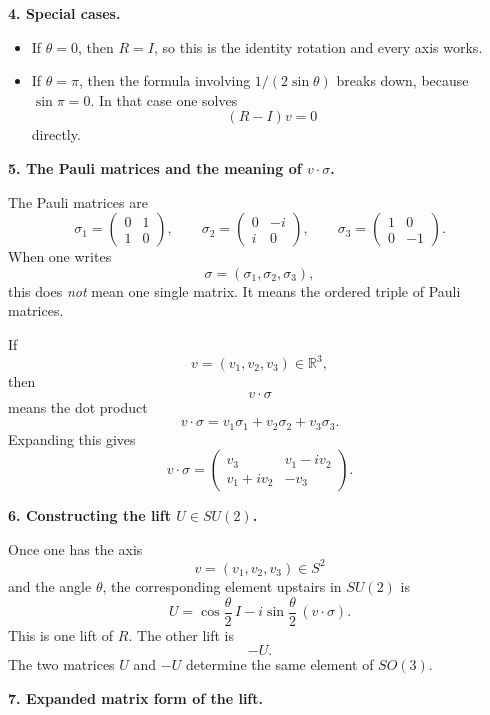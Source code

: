 \documentclass[12pt,a4paper]{article}
\theoremstyle{notespace}
\begin{document}
\medskip

\textbf{4. Special cases.}

\begin{itemize}
	\item If \(\theta=0\), then \(R=I\), so this is the identity rotation and every axis works.
	\item If \(\theta=\pi\), then the formula involving \(1/(2\sin\theta)\) breaks down, because \(\sin\pi=0\). In that case one solves
	\[
	(R-I)v=0
	\]
	directly.
\end{itemize}

\medskip

\textbf{5. The Pauli matrices and the meaning of \(v\cdot \sigma\).}

The Pauli matrices are
\[
\sigma_1=
\begin{pmatrix}
	0&1\\
	1&0
\end{pmatrix},
\qquad
\sigma_2=
\begin{pmatrix}
	0&-i\\
	i&0
\end{pmatrix},
\qquad
\sigma_3=
\begin{pmatrix}
	1&0\\
	0&-1
\end{pmatrix}.
\]
When one writes
\[
\sigma=(\sigma_1,\sigma_2,\sigma_3),
\]
this does \emph{not} mean one single matrix. It means the ordered triple of Pauli matrices.

If
\[
v=(v_1,v_2,v_3)\in \mathbb R^3,
\]
then
\[
v\cdot \sigma
\]
means the dot product
\[
\boxed{
	v\cdot \sigma = v_1\sigma_1+v_2\sigma_2+v_3\sigma_3.
}
\]
Expanding this gives
\[
v\cdot \sigma
=
\begin{pmatrix}
	v_3 & v_1-i v_2\\
	v_1+i v_2 & -v_3
\end{pmatrix}.
\]

\medskip

\textbf{6. Constructing the lift \(U\in SU(2)\).}

Once one has the axis
\[
v=(v_1,v_2,v_3)\in S^2
\]
and the angle \(\theta\), the corresponding element upstairs in \(SU(2)\) is
\[
\boxed{
	U=
	\cos\frac{\theta}{2}\,I
	-
	i\sin\frac{\theta}{2}\,(v\cdot \sigma).
}
\]
This is one lift of \(R\). The other lift is
\[
\boxed{-U.}
\]
The two matrices \(U\) and \(-U\) determine the same element of \(SO(3)\).

\medskip

\textbf{7. Expanded matrix form of the lift.}
\end{document}
